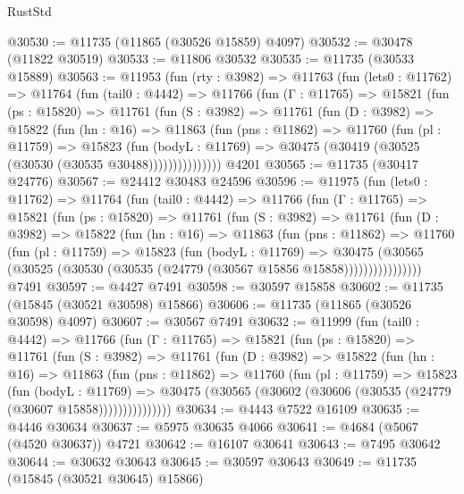 \begin{lexlean}{RustStd}
\begin{coremodule}
@30530 := @11735 (@11865 (@30526 @15859) @4097)
@30532 := @30478 (@11822 @30519)
@30533 := @11806 @30532
@30535 := @11735 (@30533 @15889)
@30563 := @11953
    (fun (rty : @3982) =>
    @11763
      (fun (lets0 : @11762) =>
      @11764
        (fun (tail0 : @4442) =>
        @11766
          (fun (Γ : @11765) =>
          @15821
            (fun (ps : @15820) =>
            @11761
              (fun (S : @3982) =>
              @11761
                (fun (D : @3982) =>
                @15822
                  (fun (hn : @16) =>
                  @11863
                    (fun (pns : @11862) =>
                    @11760
                      (fun (pl : @11759) =>
                      @15823
                        (fun (bodyL : @11769) =>
                        @30475 (@30419 (@30525 (@30530 (@30535 @30488)))))))))))))))
    @4201
@30565 := @11735 (@30417 @24776)
@30567 := @24412 @30483 @24596
@30596 := @11975
    (fun (lets0 : @11762) =>
    @11764
      (fun (tail0 : @4442) =>
      @11766
        (fun (Γ : @11765) =>
        @15821
          (fun (ps : @15820) =>
          @11761
            (fun (S : @3982) =>
            @11761
              (fun (D : @3982) =>
              @15822
                (fun (hn : @16) =>
                @11863
                  (fun (pns : @11862) =>
                  @11760
                    (fun (pl : @11759) =>
                    @15823
                      (fun (bodyL : @11769) =>
                      @30475
                        (@30565
                          (@30525 (@30530 (@30535 (@24779 (@30567 @15856 @15858))))))))))))))))
    @7491
@30597 := @4427 @7491
@30598 := @30597 @15858
@30602 := @11735 (@15845 (@30521 @30598) @15866)
@30606 := @11735 (@11865 (@30526 @30598) @4097)
@30607 := @30567 @7491
@30632 := @11999
    (fun (tail0 : @4442) =>
    @11766
      (fun (Γ : @11765) =>
      @15821
        (fun (ps : @15820) =>
        @11761
          (fun (S : @3982) =>
          @11761
            (fun (D : @3982) =>
            @15822
              (fun (hn : @16) =>
              @11863
                (fun (pns : @11862) =>
                @11760
                  (fun (pl : @11759) =>
                  @15823
                    (fun (bodyL : @11769) =>
                    @30475 (@30565 (@30602 (@30606 (@30535 (@24779 (@30607 @15858)))))))))))))))
@30634 := @4443 @7522 @16109
@30635 := @4446 @30634
@30637 := @5975 @30635 @4066
@30641 := @4684 (@5067 (@4520 @30637)) @4721
@30642 := @16107 @30641
@30643 := @7495 @30642
@30644 := @30632 @30643
@30645 := @30597 @30643
@30649 := @11735 (@15845 (@30521 @30645) @15866)

\end{coremodule}
\end{lexlean}
